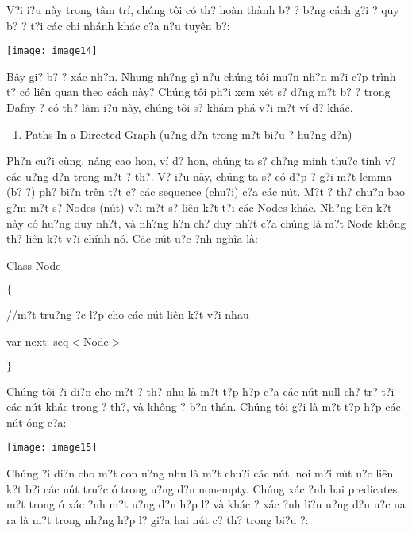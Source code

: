 \documentclass{article} %
\begin{document}
V?i {\dj}i?u n\`{a}y trong t\^{a}m tr\'{i}, ch\'{u}ng t\^{o}i c\'{o} th? ho\`{a}n th\`{a}nh b? {\dj}? b?ng c\'{a}ch g?i {\dj}? quy b? {\dj}? t?i c\'{a}c chi nh\'{a}nh kh\'{a}c c?a n?u tuy\^{e}n b?:

\noindent \texttt{[image: image14]}

B\^{a}y gi? b? {\dj}? x\'{a}c nh?n. Nhung nh?ng g\`{i} n?u ch\'{u}ng t\^{o}i mu?n nh?n m?i c?p tr\`{i}nh t? c\'{o} li\^{e}n quan theo c\'{a}ch n\`{a}y? Ch\'{u}ng t\^{o}i ph?i xem x\'{e}t s? d?ng m?t b? {\dj}? trong Dafny {\dj}? c\'{o} th? l\`{a}m {\dj}i?u n\`{a}y, ch\'{u}ng t\^{o}i s? kh\'{a}m ph\'{a} v?i m?t v\'{i} d? kh\'{a}c.

\begin{enumerate}
\item  Paths In a Directed Graph ({\dj}u?ng d?n trong m?t bi?u {\dj}? hu?ng d?n)\underbar{}
\end{enumerate}

Ph?n cu?i c\`{u}ng, n\^{a}ng cao hon, v\'{i} d? hon, ch\'{u}ng ta s? ch?ng minh thu?c t\'{i}nh v? c\'{a}c {\dj}u?ng d?n trong m?t {\dj}? th?. V? {\dj}i?u n\`{a}y, ch\'{u}ng ta s? c\'{o} d?p {\dj}? g?i m?t lemma (b? {\dj}?) ph? bi?n tr\^{e}n t?t c? c\'{a}c sequence (chu?i) c?a c\'{a}c n\'{u}t. M?t {\dj}? th? chu?n bao g?m m?t s? Nodes (n\'{u}t) v?i m?t s? li\^{e}n k?t t?i c\'{a}c Nodes kh\'{a}c. Nh?ng li\^{e}n k?t n\`{a}y c\'{o} hu?ng duy nh?t, v\`{a} nh?ng h?n ch? duy nh?t c?a ch\'{u}ng l\`{a} m?t Node kh\^{o}ng th? li\^{e}n k?t v?i ch\'{i}nh n\'{o}. C\'{a}c n\'{u}t {\dj}u?c {\dj}?nh ngh\~{i}a l\`{a}: 

Class Node

$\{$

//m?t tru?ng {\dj}?c l?p cho c\'{a}c n\'{u}t li\^{e}n k?t v?i nhau

var next: seq$<$Node$>$

$\}$

Ch\'{u}ng t\^{o}i {\dj}?i di?n cho m?t {\dj}? th? nhu l\`{a} m?t t?p h?p c?a c\'{a}c n\'{u}t null ch? tr? t?i c\'{a}c n\'{u}t kh\'{a}c trong {\dj}? th?, v\`{a} kh\^{o}ng {\dj}? b?n th\^{a}n. Ch\'{u}ng t\^{o}i g?i l\`{a} m?t t?p h?p c\'{a}c n\'{u}t {\dj}\'{o}ng c?a:

\noindent \texttt{[image: image15]}

Ch\'{u}ng {\dj}?i di?n cho m?t con {\dj}u?ng nhu l\`{a} m?t chu?i c\'{a}c n\'{u}t, noi m?i n\'{u}t {\dj}u?c li\^{e}n k?t b?i c\'{a}c n\'{u}t tru?c {\dj}\'{o} trong {\dj}u?ng d?n nonempty. Ch\'{u}ng x\'{a}c {\dj}?nh hai predicates, m?t trong {\dj}\'{o} x\'{a}c {\dj}?nh m?t {\dj}u?ng d?n h?p l? v\`{a} kh\'{a}c {\dj}? x\'{a}c {\dj}?nh li?u {\dj}u?ng d?n {\dj}u?c {\dj}ua ra l\`{a} m?t trong nh?ng h?p l? gi?a hai n\'{u}t c? th? trong bi?u {\dj}?:
\end{document}
